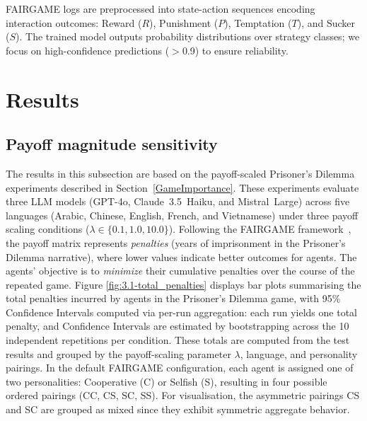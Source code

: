 \documentclass{article}
\begin{document}
FAIRGAME logs are preprocessed into state-action sequences encoding interaction outcomes: Reward ($R$), Punishment ($P$), Temptation ($T$), and Sucker ($S$). The trained model outputs probability distributions over strategy classes; we focus on high-confidence predictions ($>$0.9) to ensure reliability.

\section{Results}
\label{sec:results}

\subsection{Payoff magnitude sensitivity }
\label{res:payoff_magnitude}
The results in this subsection are based on the payoff-scaled Prisoner's Dilemma experiments described in Section~\ref{GameImportance}. These experiments evaluate three LLM models (GPT-4o, Claude~3.5~Haiku, and Mistral~Large) across five languages (Arabic, Chinese, English, French, and Vietnamese) under three payoff scaling conditions ($\lambda \in \{0.1, 1.0, 10.0\}$). Following the FAIRGAME framework~\cite{buscemi2025fairgame}, the payoff matrix represents \emph{penalties} (years of imprisonment in the Prisoner's Dilemma narrative), where lower values indicate better outcomes for agents. The agents' objective is to \emph{minimize} their cumulative penalties over the course of the repeated game.
Figure \ref{fig:3.1-total_penalties} displays bar plots summarising the total penalties incurred by agents in the Prisoner’s Dilemma game, with 95\% Confidence Intervals computed via per-run aggregation: each run yields one total penalty, and Confidence Intervals are estimated by bootstrapping across the 10 independent repetitions per condition. These totals are computed from the test results and grouped by the payoff-scaling parameter $\lambda$, language, and personality pairings. In the default FAIRGAME configuration, each agent is assigned one of two personalities: Cooperative (C) or Selfish (S), resulting in four possible ordered pairings (CC, CS, SC, SS). For visualisation, the asymmetric pairings CS and SC are grouped as mixed since they exhibit symmetric aggregate behavior.
\end{document}
